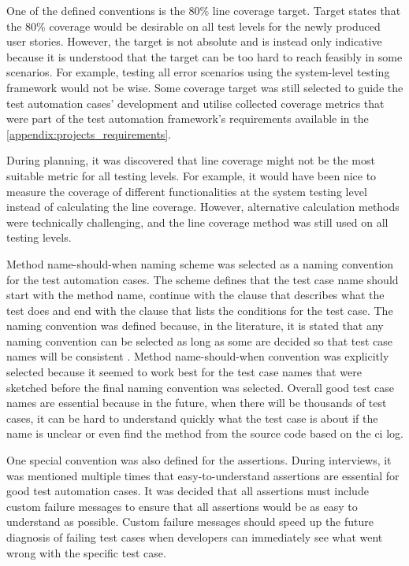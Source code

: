 One of the defined conventions is the 80\% line coverage target. Target states that the 80\% coverage would be desirable on all test levels for the newly produced user stories. However, the target is not absolute and is instead only indicative because it is understood that the target can be too hard to reach feasibly in some scenarios. For example, testing all error scenarios using the system-level testing framework would not be wise. Some coverage target was still selected to guide the test automation cases' development and utilise collected coverage metrics that were part of the test automation framework's requirements available in the \autoref{appendix:projects_requirements}.

During planning, it was discovered that line coverage might not be the most suitable metric for all testing levels. For example, it would have been nice to measure the coverage of different functionalities at the system testing level instead of calculating the line coverage. However, alternative calculation methods were technically challenging, and the line coverage method was still used on all testing levels.

Method name-should-when naming scheme was selected as a naming convention for the test automation cases. The scheme defines that the test case name should start with the method name, continue with the clause that describes what the test does and end with the clause that lists the conditions for the test case. The naming convention was defined because, in the literature, it is stated that any naming convention can be selected as long as some are decided so that test case names will be consistent \cite{stefanovskyi2019unit}. Method name-should-when convention was explicitly selected because it seemed to work best for the test case names that were sketched before the final naming convention was selected. Overall good test case names are essential because in the future, when there will be thousands of test cases, it can be hard to understand quickly what the test case is about if the name is unclear or even find the method from the source code based on the \gls{ci} log.

One special convention was also defined for the assertions. During interviews, it was mentioned multiple times that easy-to-understand assertions are essential for good test automation cases. It was decided that all assertions must include custom failure messages to ensure that all assertions would be as easy to understand as possible. Custom failure messages should speed up the future diagnosis of failing test cases when developers can immediately see what went wrong with the specific test case.

